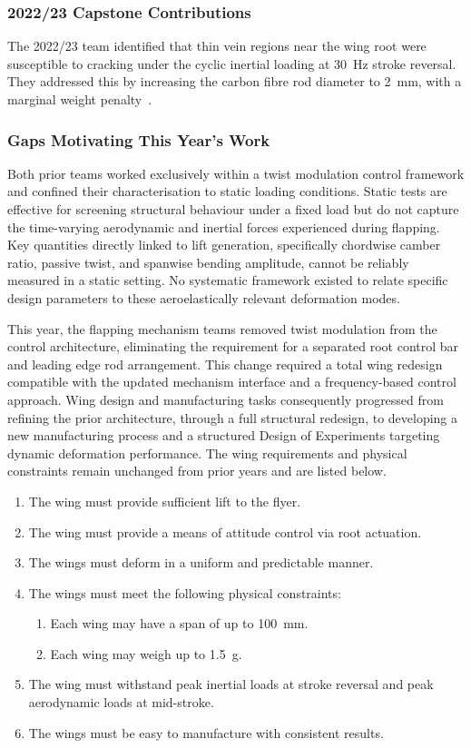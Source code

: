 \subsubsection{2022/23 Capstone Contributions}

The 2022/23 team identified that thin vein regions near the wing root were susceptible to cracking under the cyclic inertial loading at 30~Hz stroke reversal. They addressed this by increasing the carbon fibre rod diameter to 2~mm, with a marginal weight penalty~\cite{MFWF_FinalReport2023}.

\subsubsection{Gaps Motivating This Year's Work}

Both prior teams worked exclusively within a twist modulation control framework and confined their characterisation to static loading conditions. Static tests are effective for screening structural behaviour under a fixed load but do not capture the time-varying aerodynamic and inertial forces experienced during flapping. Key quantities directly linked to lift generation, specifically chordwise camber ratio, passive twist, and spanwise bending amplitude, cannot be reliably measured in a static setting. No systematic framework existed to relate specific design parameters to these aeroelastically relevant deformation modes.

This year, the flapping mechanism teams removed twist modulation from the control architecture, eliminating the requirement for a separated root control bar and leading edge rod arrangement. This change required a total wing redesign compatible with the updated mechanism interface and a frequency-based control approach. Wing design and manufacturing tasks consequently progressed from refining the prior architecture, through a full structural redesign, to developing a new manufacturing process and a structured Design of Experiments targeting dynamic deformation performance. The wing requirements and physical constraints remain unchanged from prior years and are listed below.

\begin{enumerate}
    \item The wing must provide sufficient lift to the flyer.
    \item The wing must provide a means of attitude control via root actuation.
    \item The wings must deform in a uniform and predictable manner.
    \item The wings must meet the following physical constraints:
    \begin{enumerate}
        \item Each wing may have a span of up to 100~mm.
        \item Each wing may weigh up to 1.5~g.
    \end{enumerate}
    \item The wing must withstand peak inertial loads at stroke reversal 
    and peak aerodynamic loads at mid-stroke.
    \item The wings must be easy to manufacture with consistent results.
\end{enumerate}

